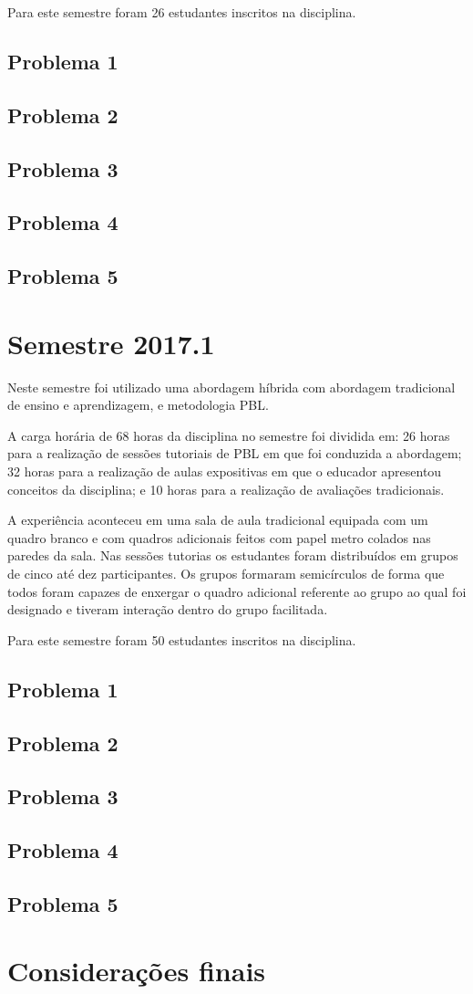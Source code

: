 Para este semestre foram 26 estudantes inscritos na disciplina.

\subsection{Problema 1}
\subsection{Problema 2}
\subsection{Problema 3}
\subsection{Problema 4}
\subsection{Problema 5}

\section{Semestre 2017.1}
Neste semestre foi utilizado uma abordagem híbrida com abordagem tradicional de ensino
e aprendizagem, e metodologia PBL.

A carga horária de 68 horas da disciplina no semestre foi dividida em:
26 horas para a realização de sessões tutoriais de PBL em que foi conduzida a abordagem;
32 horas para a realização de aulas expositivas em que o educador apresentou conceitos da disciplina;
e 10 horas para a realização de avaliações tradicionais.

A experiência aconteceu em uma sala de aula tradicional equipada com um
quadro branco e com quadros adicionais feitos com papel metro colados nas paredes da sala.
Nas sessões tutorias os estudantes foram distribuídos em grupos de cinco até dez participantes.
Os grupos formaram semicírculos de forma que todos foram capazes de
enxergar o quadro adicional referente ao grupo ao qual foi designado
e tiveram interação dentro do grupo facilitada.

Para este semestre foram 50 estudantes inscritos na disciplina.

\subsection{Problema 1}
\subsection{Problema 2}
\subsection{Problema 3}
\subsection{Problema 4}
\subsection{Problema 5}
\section{Considerações finais}
